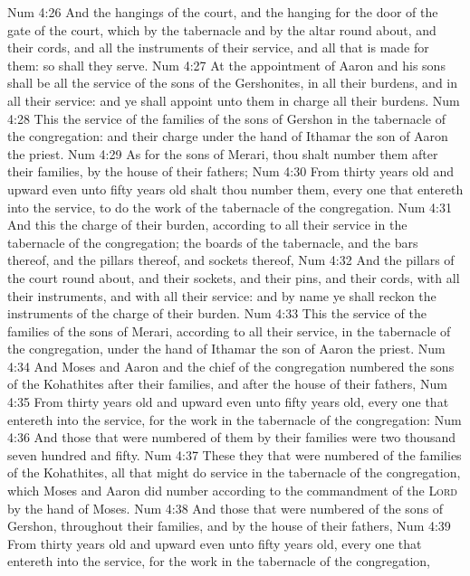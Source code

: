 \vs Num 4:26 And the hangings of the court, and the hanging for the door of the gate of the court, which  by the tabernacle and by the altar round about, and their cords, and all the instruments of their service, and all that is made for them: so shall they serve.
\vs Num 4:27 At the appointment of Aaron and his sons shall be all the service of the sons of the Gershonites, in all their burdens, and in all their service: and ye shall appoint unto them in charge all their burdens.
\vs Num 4:28 This  the service of the families of the sons of Gershon in the tabernacle of the congregation: and their charge  under the hand of Ithamar the son of Aaron the priest.
\vs Num 4:29 As for the sons of Merari, thou shalt number them after their families, by the house of their fathers;
\vs Num 4:30 From thirty years old and upward even unto fifty years old shalt thou number them, every one that entereth into the service, to do the work of the tabernacle of the congregation.
\vs Num 4:31 And this  the charge of their burden, according to all their service in the tabernacle of the congregation; the boards of the tabernacle, and the bars thereof, and the pillars thereof, and sockets thereof,
\vs Num 4:32 And the pillars of the court round about, and their sockets, and their pins, and their cords, with all their instruments, and with all their service: and by name ye shall reckon the instruments of the charge of their burden.
\vs Num 4:33 This  the service of the families of the sons of Merari, according to all their service, in the tabernacle of the congregation, under the hand of Ithamar the son of Aaron the priest.
\vs Num 4:34 And Moses and Aaron and the chief of the congregation numbered the sons of the Kohathites after their families, and after the house of their fathers,
\vs Num 4:35 From thirty years old and upward even unto fifty years old, every one that entereth into the service, for the work in the tabernacle of the congregation:
\vs Num 4:36 And those that were numbered of them by their families were two thousand seven hundred and fifty.
\vs Num 4:37 These  they that were numbered of the families of the Kohathites, all that might do service in the tabernacle of the congregation, which Moses and Aaron did number according to the commandment of the \textsc{Lord} by the hand of Moses.
\vs Num 4:38 And those that were numbered of the sons of Gershon, throughout their families, and by the house of their fathers,
\vs Num 4:39 From thirty years old and upward even unto fifty years old, every one that entereth into the service, for the work in the tabernacle of the congregation,
